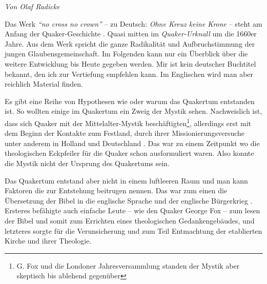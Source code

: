 


\begin{flushright}
\begin{footnotesize}
\textit{Von Olaf Radicke}
\end{footnotesize}
\end{flushright}
\smallskip

Das Werk \textit{"`no cross no crown"'} -- zu Deutsch: \textit{Ohne Kreuz keine
Krone} --
steht am Anfang der Quaker-Geschichte . Quasi mitten im
\textit{Quaker-Urknall}
um die 1660er Jahre. Aus dem Werk spricht die ganze Radikalität und
Aufbruchstimmung der jungen Glaubensgemeinschaft. Im Folgenden kann nur ein
Überblick über die weitere Entwicklung bis Heute gegeben werden. Mir ist kein
deutscher Buchtitel bekannt, den ich zur Vertiefung empfehlen kann. Im
Englischen wird man aber reichlich Material finden.

\medskip

Es gibt eine Reihe von Hypothesen wie oder warum das Quakertum
entstanden ist.
So
wollten einige im Quakertum ein Zweig der Mystik  sehen.
Nachweislich ist, dass
sich Quaker mit der Mittelalter-Mystik beschäftigten\footnote{G. Fox und die
Londoner Jahresversammlung standen der Mystik aber skeptisch bis ablehend
gegenüber}, allerdings erst mit dem
Beginn der Kontakte zum Festland, durch ihrer Missionierungsversuche
 unter
anderem in Holland  und Deutschland
. Das war zu einem Zeitpunkt wo die
theologischen Eckpfeiler für die Quaker schon ausformuliert waren. Also konnte
die Mystik nicht der Ursprung des Quakertums sein.

\medskip

Das Quakertum entstand aber nicht in einem luftleeren Raum und man kann Faktoren
die zur Entstehung beitrugen nennen. Das war zum einen die Übersetzung der Bibel
in die englische Sprache und der englische Bürgerkrieg
. Ersteres befähigte auch
einfache Leute -- wie den Quaker George Fox  -- zum
lesen der Bibel und somit zum
Errichten eines theologischen Gedankengebäudes, und letzteres sorgte für die
Verunsicherung und zum Teil Entmachtung der etablierten Kirche
 und ihrer
Theologie.

\medskip

